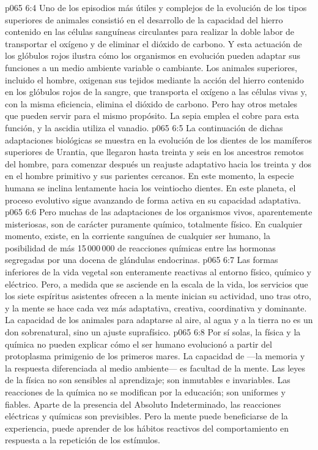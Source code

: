 \vs p065 6:4 Uno de los episodios más útiles y complejos de la evolución de los tipos superiores de animales consistió en el desarrollo de la capacidad del hierro contenido en las células sanguíneas circulantes para realizar la doble labor de transportar el oxígeno y de eliminar el dióxido de carbono. Y esta actuación de los glóbulos rojos ilustra cómo los organismos en evolución pueden adaptar sus funciones a un medio ambiente variable o cambiante. Los animales superiores, incluido el hombre, oxigenan sus tejidos mediante la acción del hierro contenido en los glóbulos rojos de la sangre, que transporta el oxígeno a las células vivas y, con la misma eficiencia, elimina el dióxido de carbono. Pero hay otros metales que pueden servir para el mismo propósito. La sepia emplea el cobre para esta función, y la ascidia utiliza el vanadio.
\vs p065 6:5 La continuación de dichas adaptaciones biológicas se muestra en la evolución de los dientes de los mamíferos superiores de Urantia, que llegaron hasta treinta y seis en los ancestros remotos del hombre, para comenzar después un reajuste adaptativo hacia los treinta y dos en el hombre primitivo y sus parientes cercanos. En este momento, la especie humana se inclina lentamente hacia los veintiocho dientes. En este planeta, el proceso evolutivo sigue avanzando de forma activa en su capacidad adaptativa.
\vs p065 6:6 Pero muchas de las adaptaciones de los organismos vivos, aparentemente misteriosas, son de carácter puramente químico, totalmente físico. En cualquier momento, existe, en la corriente sanguínea de cualquier ser humano, la posibilidad de más 15\,000\,000 de reacciones químicas entre las hormonas segregadas por una docena de glándulas endocrinas.
\vs p065 6:7 \pc Las formas inferiores de la vida vegetal son enteramente reactivas al entorno físico, químico y eléctrico. Pero, a medida que se asciende en la escala de la vida, los servicios que los siete espíritus asistentes ofrecen a la mente inician su actividad, uno tras otro, y la mente se hace cada vez más adaptativa, creativa, coordinativa y dominante. La capacidad de los animales para adaptarse al aire, al agua y a la tierra no es un don sobrenatural, sino un ajuste suprafísico.
\vs p065 6:8 Por sí solas, la física y la química no pueden explicar cómo el ser humano evolucionó a partir del protoplasma primigenio de los primeros mares. La capacidad de  ---la memoria y la respuesta diferenciada al medio ambiente--- es facultad de la mente. Las leyes de la física no son sensibles al aprendizaje; son inmutables e invariables. Las reacciones de la química no se modifican por la educación; son uniformes y fiables. Aparte de la presencia del Absoluto Indeterminado, las reacciones eléctricas y químicas son previsibles. Pero la mente puede beneficiarse de la experiencia, puede aprender de los hábitos reactivos del comportamiento en respuesta a la repetición de los estímulos.
